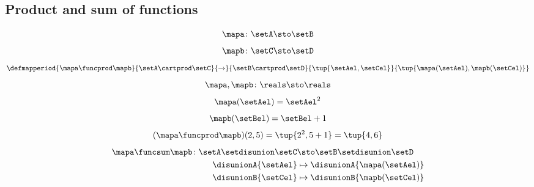 \begin{forslides}
    \subsection{Product and sum of functions}

    \begin{equation}
        \label{eq:slides_session2_169}
        \mapa\colon \setA \sto \setB
    \end{equation}
    \begin{equation}
        \label{eq:slides_session2_170}
        \mapb\colon \setC \sto \setD
    \end{equation}
    \begin{equation}
        \label{eq:slides_session2_171}
        \defmapperiod{
            \mapa \funcprod \mapb
        }{
            \setA \cartprod \setC
        }{
            \to
        }{
            \setB\cartprod \setD
        }{
            \tup{\setAel, \setCel}
        }{
            \tup{\mapa(\setAel),\mapb(\setCel)}
        }
    \end{equation}
    \begin{equation}
        \label{eq:slides_session2_172}
        \mapa,\mapb\colon \reals \sto \reals
    \end{equation}
    \begin{equation}
        \label{eq:slides_session2_173}
        \mapa(\setAel)=\setAel^2
    \end{equation}
    \begin{equation}
        \label{eq:slides_session2_174}
        \mapb(\setBel)=\setBel+1
    \end{equation}
    \begin{equation}
        \label{eq:slides_session2_175}
        (\mapa \funcprod \mapb)(2,5)=\tup{2^2,5+1}=\tup{4,6}
    \end{equation}
    \begin{equation}
        \label{eq:slides_session2_176}
        \begin{aligned}
            \mapa \funcsum \mapb \colon \setA \setdisunion \setC & \sto \setB\setdisunion \setD \\
            \disunionA{\setAel}                                  & \mapsto \disunionA{\mapa(\setAel)} \\
            \disunionB{\setCel}                                  & \mapsto \disunionB{\mapb(\setCel)} \\
        \end{aligned}
    \end{equation}

\end{forslides}
